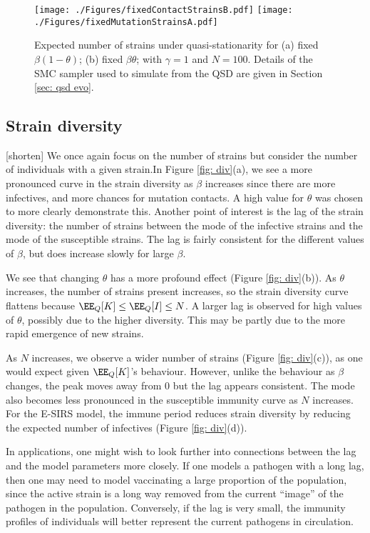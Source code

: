 \documentclass[smallextended]{svjour3}       %
\begin{document}
\begin{figure}[h!]
	\centering
  		\texttt{[image: ./Figures/fixedContactStrainsB.pdf]}
  		\texttt{[image: ./Figures/fixedMutationStrainsA.pdf]}
	\caption{Expected number of strains under quasi-stationarity for (a) fixed $\beta(1-\theta)$; (b) fixed $\beta\theta$; with $\gamma = 1$ and $N=100$. Details of the SMC sampler used to simulate from the QSD are given in Section \ref{sec: qsd evo}.
	}
	\label{fig: fix bt}
\end{figure}



\subsection{Strain diversity}
[shorten] We once again focus on the number of strains but consider the number of individuals with a given strain.In Figure \ref{fig: div}(a), we see a more pronounced curve in the strain diversity as $\beta$ increases since there are more infectives, and more chances for mutation contacts. A high value for $\theta$ was chosen to more clearly demonstrate this. Another point of interest is the lag of the strain diversity: the number of strains between the mode of the infective strains and the mode of the susceptible strains. The lag is fairly consistent for the different values of $\beta$, but does increase slowly for large $\beta$.

We see that changing $\theta$ has a more profound effect (Figure \ref{fig: div}(b)). As $\theta$ increases, the number of strains present increases, so the strain diversity curve flattens because $\EE_Q[K] \leq \EE_Q[I] \leq N$. A larger lag is observed for high values of $\theta$, possibly due to the higher diversity. This may be partly due to the more rapid emergence of new strains. 

As $N$ increases, we observe a wider number of strains (Figure \ref{fig: div}(c)), as one would expect given $\EE_Q[K]$'s behaviour. However, unlike the behaviour as $\beta$ changes, the peak moves away from 0 but the lag appears consistent. The mode also becomes less pronounced in the susceptible immunity curve as $N$ increases.
For the E-SIRS model, the immune period reduces strain diversity by reducing the expected number of infectives (Figure \ref{fig: div}(d)).

In applications, one might wish to look further into connections between the lag and the model parameters more closely. If one models a pathogen with a long lag, then one may need to model vaccinating a large proportion of the population, since the active strain is a long way removed from the current ``image'' of the pathogen in the population. 
Conversely, if the lag is very small, the immunity profiles of individuals will better represent the current pathogens in circulation.
\end{document}

